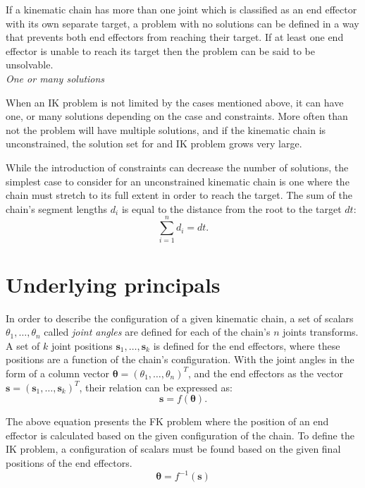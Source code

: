 If a kinematic chain has more than one joint which is classified as an end
effector with its own separate target, a problem with no solutions can be
defined in a way that prevents both end effectors from reaching their target.
If at least one end effector is unable to reach its target then the problem can
be said to be unsolvable. \\

\noindent\textit{One or many solutions}

When an IK problem is not limited by the cases mentioned above, it can have one,
or many solutions depending on the case and constraints. More often than not the
problem will have multiple solutions, and if the kinematic chain is
unconstrained, the solution set for and IK problem grows very large.

While the introduction of constraints can decrease the number of solutions, the
simplest case to consider for an unconstrained kinematic chain is one where the
chain must stretch to its full extent in order to reach the target. The sum of
the chain's segment lengths \(d_i\) is equal to the distance from the root to
the target \(dt\):
\begin{equation}
    \sum_{i=1}^{n}d_i = dt.
\end{equation}

\section{Underlying principals}
In order to describe the configuration of a given kinematic chain, a set of
scalars \(\theta_1, \dots, \theta_n\) called \textit{joint angles} are defined
for each of the chain's \(n\) joints transforms. A set of \(k\) joint
positions \(\mathbf{s}_1, \dots, \mathbf{s}_k\) is defined for the end
effectors, where these positions are a function of the chain's configuration.
With the joint angles in the form of a column vector \(\bm{\theta} = (\theta_1,
\dots, \theta_n)^T\), and the end effectors as the vector \(\mathbf{s}
= (\mathbf{s}_1, \dots, \mathbf{s}_k)^T\), their relation can be expressed as:
\begin{equation} 
    \mathbf{s} = f(\bm{\theta}).
\end{equation}

The above equation \cite{Aristidou:2018:IK_survey} presents the FK problem where
the position of an end effector is calculated based on the given configuration
of the chain. To define the IK problem, a configuration of scalars must be found
based on the given final positions of the end effectors.
\begin{equation}
    \bm{\theta} = f^{-1}(\mathbf{s})
\end{equation}

